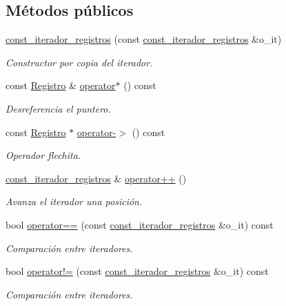 \subsection*{Métodos públicos}
\begin{DoxyCompactItemize}
\item 
\hyperlink{classTabla_1_1const__iterador__registros_a904a84af50ced6c3d9e77e10d6e5192a}{const\-\_\-iterador\-\_\-registros} (const \hyperlink{classTabla_1_1const__iterador__registros}{const\-\_\-iterador\-\_\-registros} \&o\-\_\-it)
\begin{DoxyCompactList}\small\item\em Constructor por copia del iterador. \end{DoxyCompactList}\item 
const \hyperlink{classRegistro}{Registro} \& \hyperlink{classTabla_1_1const__iterador__registros_ae09f1cd7f790f7b3d9cb392a6f8ebbe5}{operator$\ast$} () const 
\begin{DoxyCompactList}\small\item\em Desreferencia el puntero. \end{DoxyCompactList}\item 
const \hyperlink{classRegistro}{Registro} $\ast$ \hyperlink{classTabla_1_1const__iterador__registros_aca0f97220fabe6bf6f822f1b217c76d5}{operator-\/$>$} () const 
\begin{DoxyCompactList}\small\item\em Operador flechita. \end{DoxyCompactList}\item 
\hyperlink{classTabla_1_1const__iterador__registros}{const\-\_\-iterador\-\_\-registros} \& \hyperlink{classTabla_1_1const__iterador__registros_a396373a330a7c56e3112df2bcccef885}{operator++} ()
\begin{DoxyCompactList}\small\item\em Avanza el iterador una posición. \end{DoxyCompactList}\item 
bool \hyperlink{classTabla_1_1const__iterador__registros_a97bb754644a0761f832bb858df07b2ff}{operator==} (const \hyperlink{classTabla_1_1const__iterador__registros}{const\-\_\-iterador\-\_\-registros} \&o\-\_\-it) const 
\begin{DoxyCompactList}\small\item\em Comparación entre iteradores. \end{DoxyCompactList}\item 
bool \hyperlink{classTabla_1_1const__iterador__registros_a042b2cc92666f899b9b503327f84b7ac}{operator!=} (const \hyperlink{classTabla_1_1const__iterador__registros}{const\-\_\-iterador\-\_\-registros} \&o\-\_\-it) const 
\begin{DoxyCompactList}\small\item\em Comparación entre iteradores. \end{DoxyCompactList}\end{DoxyCompactItemize}

